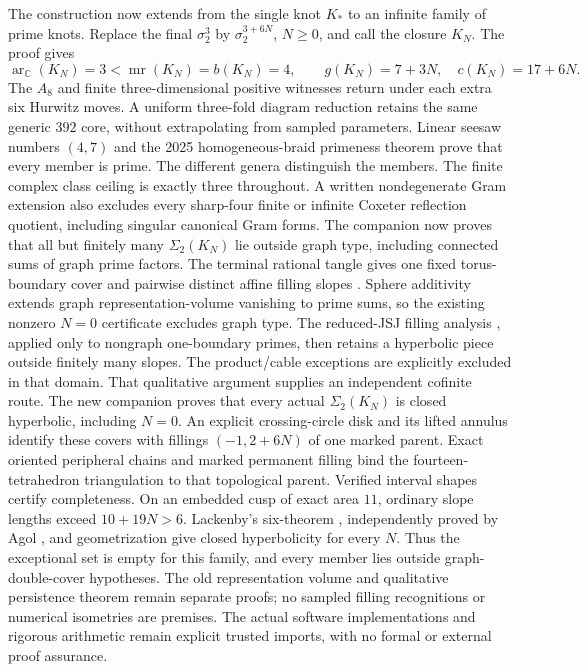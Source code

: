 \documentclass[11pt]{article}
\begin{document}
The construction now extends from the single knot $K_*$ to an
infinite family of prime knots. Replace the final $\sigma_2^3$ by
$\sigma_2^{3+6N}$, $N\ge0$, and call the closure $K_N$.
The proof  gives
\[
 \operatorname{ar}_{\mathbb C}(K_N)=3<\operatorname{mr}(K_N)
 =b(K_N)=4,\qquad g(K_N)=7+3N,\quad c(K_N)=17+6N.
\]
The $A_8$ and finite three-dimensional positive witnesses return
under each extra six Hurwitz moves. A uniform three-fold diagram
reduction retains the same generic $392$ core, without extrapolating
from sampled parameters. Linear seesaw numbers $(4,7)$ and the
2025 homogeneous-braid primeness theorem \cite{flo25} prove that
every member is prime. The different genera distinguish the members.
The finite complex class ceiling is exactly three throughout.
A written nondegenerate Gram extension also excludes every sharp-four
finite or infinite Coxeter reflection quotient, including singular
canonical Gram forms. The companion  now proves
that all but finitely many $\Sigma_2(K_N)$ lie outside graph type,
including connected sums of graph prime factors. The terminal rational
tangle gives one fixed torus-boundary cover and pairwise distinct affine
filling slopes \cite[Lemma12,p.7]{mz23}. Sphere additivity extends graph
representation-volume vanishing to prime sums, so the existing nonzero
$N=0$ certificate excludes graph type. The reduced-JSJ filling analysis
\cite[pp.50--51]{bc04}, applied only to nongraph one-boundary primes,
then retains a hyperbolic piece outside finitely many slopes.
The product/cable exceptions are explicitly excluded in that domain.
That qualitative argument supplies an independent cofinite route.
The new companion 
proves that every actual $\Sigma_2(K_N)$ is closed hyperbolic, including
$N=0$. An explicit crossing-circle disk and its lifted annulus identify
these covers with fillings $(-1,2+6N)$ of one marked parent.
Exact oriented peripheral chains and marked permanent filling bind
the fourteen-tetrahedron triangulation to that topological parent.
Verified interval shapes certify completeness. On an embedded cusp
of exact area $11$, ordinary slope lengths exceed $10+19N>6$.
Lackenby's six-theorem \cite[Theorem3.1,p.12]{lackenby00}, independently
proved by Agol \cite[Theorem6.2,p.440]{agol00}, and geometrization
\cite[Theorem1.7.6,p.19]{afw} give closed hyperbolicity for every $N$.
Thus the exceptional set is empty for this family, and every member
lies outside graph-double-cover hypotheses. The old representation
volume and qualitative persistence theorem remain separate proofs;
no sampled filling recognitions or numerical isometries are premises.
The actual software implementations and rigorous arithmetic remain
explicit trusted imports, with no formal or external proof assurance.
\end{document}
